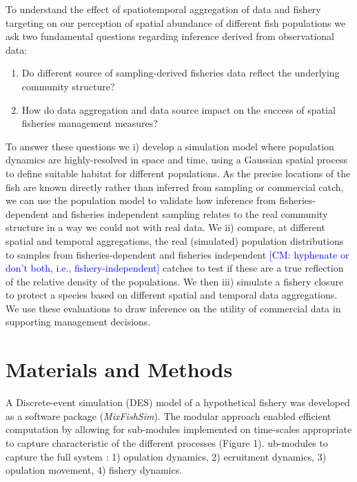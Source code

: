 \documentclass[review]{elsarticle}
\begin{document}
To understand the effect of spatiotemporal aggregation of data and fishery
targeting on our perception of spatial abundance of different fish populations
we ask two fundamental questions regarding inference derived from observational
data:

\begin{enumerate}
	\item Do different source of sampling-derived fisheries data
		reflect the underlying community structure? 	
	\item How do data aggregation and data source impact on the success
		of spatial fisheries management measures?
\end{enumerate}
	
To answer these questions we i) develop a simulation model where population
dynamics are highly-resolved in space and time, using a Gaussian spatial
process to define suitable habitat for different populations. As the precise
locations of the fish are known directly rather than inferred from sampling
or commercial catch, we can use the population model to validate how inference
from fisheries-dependent and fisheries independent sampling relates to the real
community structure in a way we could not with real data. We ii) compare, at
different spatial and temporal aggregations, the real (simulated) population
distributions to samples from fisheries-dependent and fisheries independent \textcolor{blue}{[CM: hyphenate or don't both, i.e., fishery-independent]}
catches to test if these are a true reflection of the relative density of the
populations. We then iii) simulate a fishery closure to protect a species based
on different spatial and temporal data aggregations. \\

We use these evaluations to draw inference on the utility of commercial data in
supporting management decisions.  

\section{Materials and Methods}

A Discrete-event simulation (DES) model of a hypothetical fishery was developed
as a software package (\textit{MixFishSim}). The modular approach enabled
efficient computation by allowing for sub-modules implemented on time-scales
appropriate to capture characteristic of the different processes (Figure
1). ub-modules to capture the full system : 1)
opulation dynamics, 2) ecruitment dynamics, 3) opulation movement, 4)
fishery dynamics.\\
\end{document}
